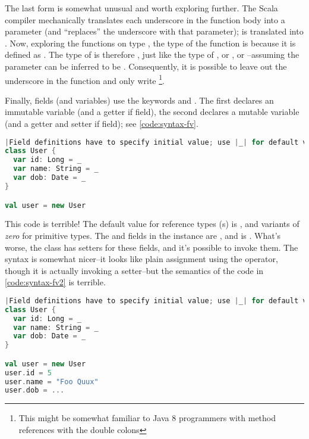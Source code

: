 \documentclass[10 pt]{article}
\begin{document}
The last form  is somewhat unusual and worth exploring further. The Scala compiler mechanically translates each underscore in the function body into a parameter (and ``replaces'' the underscore with that parameter);  is translated into . Now, exploring the functions on type , the type of the function \pcode{*} is  because it is defined as . The type of  is therefore , just like the type of , or , or --assuming the parameter can be inferred to be . Consequently, it is possible to leave out the underscore in the  function and only write \footnote{This might be somewhat familiar to Java 8 programmers with method references with the double colons}.

Finally, fields (and variables) use the keywords  and . The first declares an immutable variable (and a getter if field), the second declares a mutable variable (and a getter and setter if field); see \autoref{code:syntax-fv}.

\begin{lstlisting}[caption={Fields \& variables}, label={code:syntax-fv}, language=Scala, escapechar=|]
|Field definitions have to specify initial value; use |_| for default value.|
class User {
  var id: Long = _
  var name: String = _
  var dob: Date = _
}

val user = new User
\end{lstlisting}

This code is terrible! The default value for reference types (s) is , and variants of \emph{zero} for primitive types. The  and  fields in the  instance are , and  is . What's worse, the class has setters for these fields, and it's possible to invoke them. The syntax is somewhat nicer--it looks like plain assignment using the \pcode{=} operator, though it is actually invoking a setter--but the semantics of the code in \autoref{code:syntax-fv2} is terrible.

\begin{lstlisting}[caption={Fields \& variables II}, label={code:syntax-fv2}, language=Scala, escapechar=|]
|Field definitions have to specify initial value; use |_| for default value.|
class User {
  var id: Long = _
  var name: String = _
  var dob: Date = _
}

val user = new User
user.id = 5
user.name = "Foo Quux"
user.dob = ...
\end{lstlisting}
\end{document}
